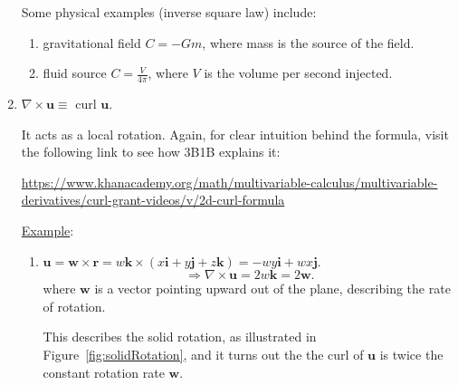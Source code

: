 \documentclass[12pt]{report}
\theoremstyle{definition}
\begin{document}
\begin{enumerate}[label = (\arabic*)]
        Some physical examples (inverse square law) include:
        \begin{enumerate}[label = (\roman*)]
            \item gravitational field $C = -Gm$, where mass is the source of the field.
            \item fluid source $C = \frac{V}{4\pi}$, where $V$ is the volume per second injected.
        \end{enumerate}
        
    \item $\nabla\times\mathbf{u}\equiv$ curl $\mathbf{u}$.

        It acts as a local rotation.
        Again, for clear intuition behind the formula, visit the following link
        to see how 3B1B explains it:

        \ul{https://www.khanacademy.org/math/multivariable-calculus/multivariable-derivatives/curl-grant-videos/v/2d-curl-formula}

        \underline{Example}:
        \begin{enumerate}[label = (\alph*)]
            \item $\mathbf{u} = \mathbf{w}\times \mathbf{r}
                = w\mathbf{k}\times(x\mathbf{i}+y\mathbf{j}+z\mathbf{k})
                = -wy\mathbf{i} + wx\mathbf{j}$.\[
                    \Rightarrow{}\nabla\times\mathbf{u} = 2w\mathbf{k} = 2\mathbf{w}.
                \]where $\mathbf{w}$ is a vector pointing upward
                out of the plane, describing the rate of rotation.

                This describes the solid rotation,
                as illustrated in Figure~\ref{fig:solidRotation},
                and it turns out the the curl of $\mathbf{u}$ 
                is twice the constant rotation rate $\mathbf{w}$.


\end{enumerate}
\end{enumerate}
\end{document}

